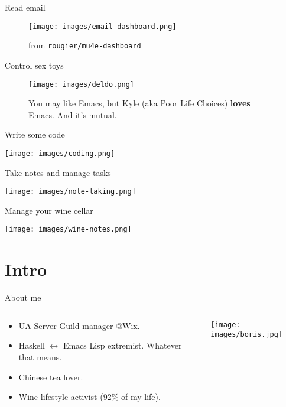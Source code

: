 \documentclass[presentation,aspectratio=169,smaller]{beamer}
\begin{document}
\begin{frame}[label={sec:orgbdfb417}]{Read email}
\begin{figure}[htbp]
\centering
\texttt{[image: images/email-dashboard.png]}
\caption{from \texttt{rougier/mu4e-dashboard}}
\end{figure}
\end{frame}

\begin{frame}[label={sec:orgae303f2}]{Control sex toys}
\begin{figure}[htbp]
\centering
\texttt{[image: images/deldo.png]}
\caption{You may like Emacs, but Kyle (aka Poor Life Choices) \textbf{loves} Emacs. And it's mutual.}
\end{figure}
\end{frame}

\begin{frame}[label={sec:org8057d42}]{Write some code}
\begin{center}
\texttt{[image: images/coding.png]}
\end{center}
\end{frame}

\begin{frame}[label={sec:org116498e}]{Take notes and manage tasks}
\begin{center}
\texttt{[image: images/note-taking.png]}
\end{center}
\end{frame}

\begin{frame}[label={sec:org01c0b81}]{Manage your wine cellar}
\begin{center}
\texttt{[image: images/wine-notes.png]}
\end{center}
\end{frame}

\section*{Intro}
\label{sec:orgb7058e5}
\begin{frame}[label={sec:org0da4cfd}]{About me}
\begin{columns}
\begin{column}{0.75\columnwidth}
\begin{itemize}
\item UA Server Guild manager @Wix.
\item Haskell \(\leftrightarrow\) Emacs Lisp extremist. Whatever that means.
\item Chinese tea lover.
\item Wine-lifestyle activist (92\% of my life).
\end{itemize}
\end{column}

\begin{column}{0.25\columnwidth}
\begin{center}
\texttt{[image: images/boris.jpg]}
\end{center}
\end{column}
\end{columns}
\end{frame}
\end{document}
